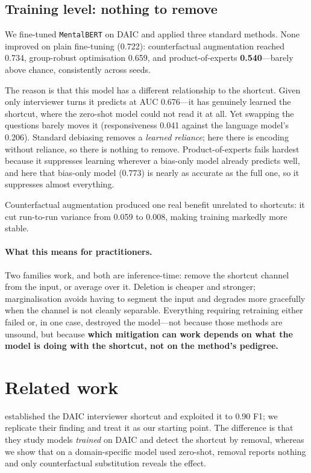 \documentclass{article}
\begin{document}
\subsection{Training level: nothing to remove}

We fine-tuned \texttt{MentalBERT} on DAIC and applied three standard methods.
None improved on plain fine-tuning (0.722): counterfactual augmentation reached
0.734, group-robust optimisation \citep{sagawa2019groupdro} 0.659, and
product-of-experts \citep{clark2019poe,sanh2020lmm} \textbf{0.540}---barely above
chance, consistently across seeds.

The reason is that this model has a different relationship to the shortcut.
Given only interviewer turns it predicts at AUC 0.676---it has genuinely learned
the shortcut, where the zero-shot model could not read it at all. Yet swapping
the questions barely moves it (responsiveness 0.041 against the language model's
0.206). Standard debiasing removes a \emph{learned reliance}; here there is
encoding without reliance, so there is nothing to remove. Product-of-experts
fails hardest because it suppresses learning wherever a bias-only model already
predicts well, and here that bias-only model (0.773) is nearly as accurate as
the full one, so it suppresses almost everything.

Counterfactual augmentation produced one real benefit unrelated to shortcuts: it
cut run-to-run variance from 0.059 to 0.008, making training markedly more
stable.

\paragraph{What this means for practitioners.} Two families work, and both are
inference-time: remove the shortcut channel from the input, or average over it.
Deletion is cheaper and stronger; marginalisation avoids having to segment the
input and degrades more gracefully when the channel is not cleanly separable.
Everything requiring retraining either failed or, in one case, destroyed the
model---not because those methods are unsound, but because \textbf{which
mitigation can work depends on what the model is doing with the shortcut, not on
the method's pedigree.}

\section{Related work}

\citet{burdisso2024daicwoz} established the DAIC interviewer shortcut and
exploited it to 0.90 F1; we replicate their finding and treat it as our starting
point. The difference is that they study models \emph{trained} on DAIC and detect
the shortcut by removal, whereas we show that on a domain-specific model used
zero-shot, removal reports nothing and only counterfactual substitution reveals
the effect.
\end{document}
